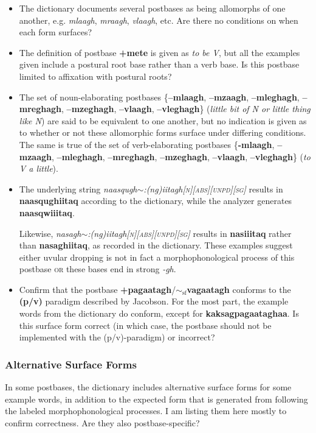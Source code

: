 \documentclass{article}
\begin{document}
\begin{itemize}
\item The dictionary documents several postbases as being allomorphs of one another, e.g. \textit{mlaagh}, \textit{mraagh}, \textit{vlaagh}, etc. Are there no conditions on when each form surfaces?

\item The definition of postbase \textbf{+mete} is given as \textit{to be V}, but all the examples given include a postural root base rather than a verb base. Is this postbase limited to affixation with postural roots?

\item The set of noun-elaborating postbases \{\textbf{--mlaagh}, \textbf{--mzaagh}, \textbf{--mleghagh}, \textbf{--mreghagh}, \textbf{--mzeghagh}, \textbf{--vlaagh}, \textbf{--vleghagh}\} (\textit{little bit of N or little thing like N}) are said to be equivalent to one another, but no indication is given as to whether or not these allomorphic forms surface under differing conditions. The same is true of the set of verb-elaborating postbases \{\textbf{\--mlaagh}, \textbf{--mzaagh}, \textbf{--mleghagh}, \textbf{--mreghagh}, \textbf{--mzeghagh}, \textbf{--vlaagh}, \textbf{--vleghagh}\} (\textit{to V a little}).

\item The underlying string \textit{naasqugh$\sim$:(ng)iitagh\textsc{[n][abs][unpd][sg]}} results in \textbf{naasqughiitaq} according to the dictionary, while the analyzer generates \textbf{naasqwiiitaq}.

Likewise, \textit{nasagh$\sim$:(ng)iitagh\textsc{[n][abs][unpd][sg]}} results in \textbf{nasiiitaq} rather than \textbf{nasaghiitaq}, as recorded in the dictionary. These examples suggest either uvular dropping is not in fact a morphophonological process of this postbase \textsc{or} these bases end in strong \textit{-gh}.

\item Confirm that the postbase \textbf{+pagaatagh}/\textbf{$\sim_\text{sf}$vagaatagh} conforms to the \textbf{(p/v)} paradigm described by Jacobson. For the most part, the example words from the dictionary do conform, except for \textbf{kaksagpagaataghaa}. Is this surface form correct (in which case, the postbase should not be implemented with the (p/v)-paradigm) or incorrect?
\end{itemize}

\subsubsection{Alternative Surface Forms}
In some postbases, the dictionary includes alternative surface forms for some example words, in addition to the expected form that is generated from following the labeled morphophonological processes. I am listing them here mostly to confirm correctness. Are they also postbase-specific?
\end{document}
